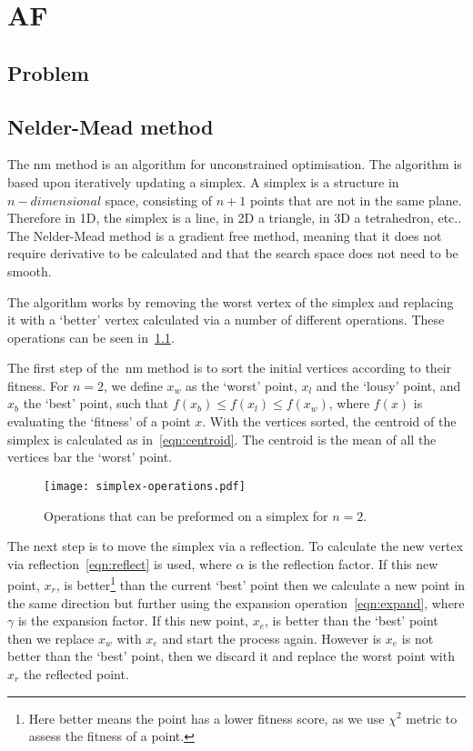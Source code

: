 \chapter{AF}
\label{chap:salvo}
\section{Problem}




\section{Nelder-Mead method}

The \gls*{nm} method is an algorithm for unconstrained optimisation. 
The algorithm is based upon iteratively updating a simplex. 
A simplex is a structure in $n-dimensional$ space, consisting of $n+1$ points that are not in the same plane. 
Therefore in 1D, the simplex is a line, in 2D a triangle, in 3D a tetrahedron, etc.. 
The Nelder-Mead method is a gradient free method, meaning that it does not require derivative to be calculated and that the search space does not need to be smooth.

The algorithm works by removing the worst vertex of the simplex and replacing it with a `better' vertex calculated via a number of different operations.
These operations can be seen in~\cref{fig:NM-operations}.

The first step of the~\gls*{nm} method is to sort the initial vertices according to their fitness.
For $n=2$, we define $x_w$ as the `worst' point, $x_l$ and the `lousy' point, and $x_b$ the `best' point, such that $f(x_b)\leq f(x_l)\leq f(x_w)$, where $f(x)$ is evaluating the `fitness' of a point $x$.
With the vertices sorted, the centroid of the simplex is calculated as in~\cref{eqn:centroid}.
The centroid is the mean of all the vertices bar the `worst' point.

\begin{figure}[!htbp]
    \centering
    \texttt{[image: simplex-operations.pdf]}
    \caption{Operations that can be preformed on a simplex for $n=2$.}
    \label{fig:NM-operations}
\end{figure}

The next step is to move the simplex via a reflection.
To calculate the new vertex via reflection~\cref{eqn:reflect} is used, where $\alpha$ is the reflection factor.
If this new point, $x_r$, is better\footnote{Here better means the point has a lower fitness score, as we use $\chi^2$ metric to assess the fitness of a point.} than the current `best' point then we calculate a new point in the same direction but further using the expansion operation~\cref{eqn:expand}, where $\gamma$ is the expansion factor.
If this new point, $x_e$, is better than the `best' point then we replace $x_w$ with $x_e$ and start the process again.
However is $x_e$ is not better than the `best' point, then we discard it and replace the worst point with $x_r$ the reflected point.

